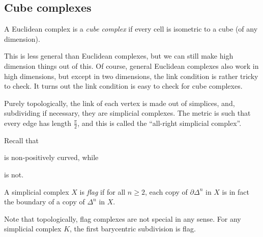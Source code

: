 \documentclass[a4paper]{article}
\begin{document}
\subsection{Cube complexes}
\begin{defi}
  A Euclidean complex is a \emph{cube complex} if every cell is isometric to a cube (of any dimension).
\end{defi}
This is less general than Euclidean complexes, but we can still make high dimension things out of this. Of course, general Euclidean complexes also work in high dimensions, but except in two dimensions, the link condition is rather tricky to check. It turns out the link condition is easy to check for cube complexes.

Purely topologically, the link of each vertex is made out of simplices, and, subdividing if necessary, they are simplicial complexes. The metric is such that every edge has length $\frac{\pi}{2}$, and this is called the ``all-right simplicial complex''.

Recall that
\begin{center}
\end{center}
is non-positively curved, while
\begin{center}
\end{center}
is not.

\begin{defi}
  A simplicial complex $X$ is \emph{flag} if for all $n \geq 2$, each copy of $\partial \Delta^n$ in $X$ is in fact the boundary of a copy of $\Delta^n$ in $X$.
\end{defi}
Note that topologically, flag complexes are not special in any sense. For any simplicial complex $K$, the first barycentric subdivision is flag.
\end{document}
